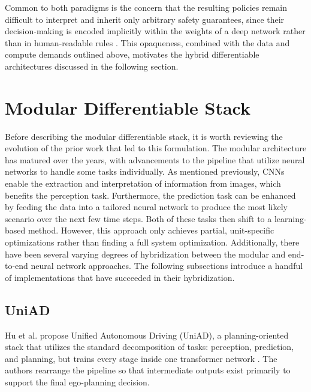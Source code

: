 Common to both paradigms is the concern that the resulting policies remain difficult to interpret and inherit only arbitrary safety guarantees, since their decision-making is encoded implicitly within the weights of a deep network rather than in human-readable rules \cite{tampuu_SurveyEndtoEndDriving_2022, wang_VersatileEfficientReinforcement_2022, hu_review_2026, jain_Autonomy_20_2021, jahncke_MINDStackModularInterpretable_2025}.
This opaqueness, combined with the data and compute demands outlined above, motivates the hybrid differentiable architectures discussed in the following section.

\section{Modular Differentiable Stack}
\label{section:ModDiffStack}

Before describing the modular differentiable stack, it is worth reviewing the evolution of the prior work that led to this formulation.
The modular architecture has matured over the years, with advancements to the pipeline that utilize neural networks to handle some tasks individually.
As mentioned previously, CNNs enable the extraction and interpretation of information from images, which benefits the perception task.
Furthermore, the prediction task can be enhanced by feeding the data into a tailored neural network to produce the most likely scenario over the next few time steps.
Both of these tasks then shift to a learning-based method.
However, this approach only achieves partial, unit-specific optimizations rather than finding a full system optimization.
Additionally, there have been several varying degrees of hybridization between the modular and end-to-end neural network approaches.
The following subsections introduce a handful of implementations that have succeeded in their hybridization.

\subsection{UniAD}
\label{subsection:UniAD}

Hu et al. \cite{hu_planning-UniAD_2023} propose Unified Autonomous Driving (UniAD), a planning-oriented stack that utilizes the standard decomposition of tasks: perception, prediction, and planning, but trains every stage inside one transformer network \cite{vaswani_AttentionAllYou_2017}.
The authors rearrange the pipeline so that intermediate outputs exist primarily to support the final ego-planning decision.

